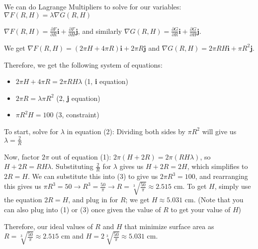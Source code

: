 \documentclass{article}
\begin{document}
\par\noindent\Large We can do Lagrange Multipliers to solve for our variables: $\nabla F(R, H) = \lambda\nabla G(R, H)$
\par\noindent\Large $\nabla F(R, H) = \frac{\partial F}{\partial R}\textbf{i} + \frac{\partial F}{\partial H}\textbf{j}$, and similarly $\nabla G(R, H) = \frac{\partial G}{\partial R}\textbf{i} + \frac{\partial G}{\partial H}\textbf{j}$.
\par\noindent\Large We get $\nabla F(R, H) = (2\pi H + 4\pi R)\textbf{i} + 2\pi R\textbf{j}$ and $\nabla G(R, H) = 2\pi RH\textbf{i} + \pi R^{2}\textbf{j}$.\vspace{0.25cm}

\par\noindent\Large Therefore, we get the following system of equations:
\begin{itemize}
    \item $2\pi H + 4\pi R = 2\pi RH\lambda$ (1, \textbf{i} equation)
    \item $2\pi R = \lambda\pi R^{2}$ (2, \textbf{j} equation)
    \item $\pi R^{2}H = 100$ (3, constraint)
\end{itemize}

\par\noindent\Large To start, solve for $\lambda$ in equation (2): Dividing both sides by $\pi R^{2}$ will give us $\lambda = \frac{2}{R}$
\par\noindent\Large Now, factor $2\pi$ out of equation (1): $2\pi(H + 2R) = 2\pi(RH\lambda)$, so $H + 2R = RH\lambda$.  Substituting $\frac{2}{R}$ for $\lambda$ gives us $H + 2R = 2H$, which simplifies to $2R = H$.  We can substitute this into (3) to give us $2\pi R^{3} = 100$, and rearranging this gives us $\pi R^{3} = 50 \rightarrow R^{3} = \frac{50}{\pi} \rightarrow R = \sqrt[3]{\frac{50}{\pi}} \approx 2.515$ cm.  To get $H$, simply use the equation $2R = H$, and plug in for $R$; we get $H \approx 5.031$ cm.  (Note that you can also plug into (1) or (3) once given the value of $R$ to get your value of $H$)\vspace{0.25cm}

\par\noindent\Large Therefore, our ideal values of $R$ and $H$ that minimize surface area as $R = \sqrt[3]{\frac{50}{\pi}} \approx 2.515$ cm and $H = 2\sqrt[3]{\frac{50}{\pi}} \approx 5.031$ cm.
\end{document}
